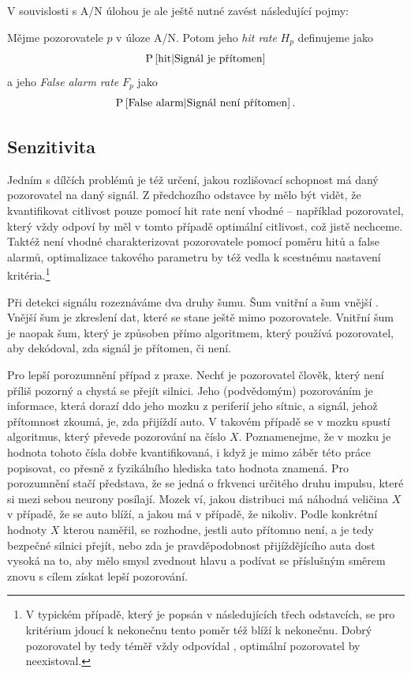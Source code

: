 V souvislosti s A/N úlohou je ale ještě nutné zavést následující pojmy:

\begin{definice}\label{hitrate}
Mějme pozorovatele $p$ v úloze A/N. Potom jeho \emph{hit rate\/} $H_p$ definujeme jako $$\P{\text{hit}|\text{Signál je přítomen}}$$ a jeho \emph{False alarm rate\/} $F_p$ jako $$\P{\text{False alarm}|\text{Signál není přítomen}}.$$
\end{definice}

\subsection{Senzitivita}

Jedním s dílčích problémů je též určení, jakou rozlišovací schopnost má daný
pozorovatel na daný signál. Z předchozího odstavce by mělo být vidět, že
kvantifikovat citlivost pouze pomocí hit rate není vhodné -- například pozorovatel, který vždy odpoví
 by měl v tomto případě optimální citlivost, což jistě nechceme. Taktéž
není vhodné charakterizovat pozorovatele pomocí poměru hitů a false alarmů,
optimalizace takového parametru by též vedla k scestnému nastavení
kritéria.\footnote{V typickém případě, který je popsán v následujících třech
odstavcích, se pro kritérium jdoucí k nekonečnu tento poměr též blíží k
nekonečnu. Dobrý pozorovatel by tedy téměř vždy odpovídal , optimální
pozorovatel by neexistoval.}

Při detekci signálu rozeznáváme dva druhy šumu. Šum vnitřní a šum vnější \citep{DavidSDT}.
Vnější šum je zkreslení dat, které se stane ještě mimo pozorovatele. Vnitřní
šum je naopak šum, který je způsoben přímo algoritmem, který používá
pozorovatel, aby dekódoval, zda signál je přítomen, či není.

Pro lepší porozumnění případ z praxe. Nechť je pozorovatel člověk, který není
příliš pozorný a chystá se přejít silnici. Jeho (podvědomým) pozorováním je
informace, která dorazí ddo jeho mozku z periferií jeho sítnic, a signál, jehož
přítomnost zkoumá, je, zda přijíždí auto. V takovém případě se v mozku spustí
algoritmus, který převede pozorování na číslo $X$. Poznamenejme, že v mozku je
hodnota tohoto čísla dobře kvantifikovaná, i když je mimo záběr této práce
popisovat, co přesně z fyzikálního hlediska tato hodnota znamená. Pro
porozumnění stačí představa, že se jedná o frkvenci určitého druhu impulsu,
které si mezi sebou neurony posílají. Mozek ví, jakou distribuci má náhodná
veličina $X$ v případě, že se auto blíží, a jakou má v případě, že nikoliv.
Podle konkrétní hodnoty $X$ kterou naměřil, se rozhodne, jestli auto přítomno
není, a je tedy bezpečné silnici přejít, nebo zda je pravděpodobnost
přijíždějícího auta dost vysoká na to, aby mělo smysl zvednout hlavu a podívat
se příslušným směrem znovu s cílem získat lepší pozorování.

